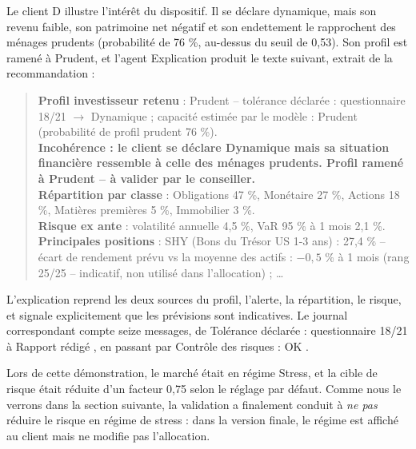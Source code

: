 Le client D illustre l'intérêt du dispositif. Il se déclare dynamique, mais son revenu faible, son patrimoine net négatif et son endettement le rapprochent des ménages prudents (probabilité de 76 \%, au-dessus du seuil de 0,53). Son profil est ramené à Prudent, et l'agent Explication produit le texte suivant, extrait de la recommandation :

\begin{quote}
\small
\textbf{Profil investisseur retenu} : Prudent -- tolérance déclarée : questionnaire 18/21 $\rightarrow$ Dynamique ; capacité estimée par le modèle : Prudent (probabilité de profil prudent 76 \%).\\
\textbf{Incohérence : le client se déclare Dynamique mais sa situation financière ressemble à celle des ménages prudents. Profil ramené à Prudent -- à valider par le conseiller.}\\
\textbf{Répartition par classe} : Obligations 47 \%, Monétaire 27 \%, Actions 18 \%, Matières premières 5 \%, Immobilier 3 \%.\\
\textbf{Risque ex ante} : volatilité annuelle 4,5 \%, VaR 95 \% à 1 mois 2,1 \%.\\
\textbf{Principales positions} : SHY (Bons du Trésor US 1-3 ans) : 27,4 \% -- écart de rendement prévu vs la moyenne des actifs : $-0{,}5$ \% à 1 mois (rang 25/25 -- indicatif, non utilisé dans l'allocation) ; \dots
\end{quote}

L'explication reprend les deux sources du profil, l'alerte, la répartition, le risque, et signale explicitement que les prévisions sont indicatives. Le journal correspondant compte seize messages, de \og Tolérance déclarée : questionnaire 18/21 \fg{} à \og Rapport rédigé \fg{}, en passant par \og Contrôle des risques : OK \fg{}.

Lors de cette démonstration, le marché était en régime Stress, et la cible de risque était réduite d'un facteur 0,75 selon le réglage par défaut. Comme nous le verrons dans la section suivante, la validation a finalement conduit à \emph{ne pas} réduire le risque en régime de stress : dans la version finale, le régime est affiché au client mais ne modifie pas l'allocation.
